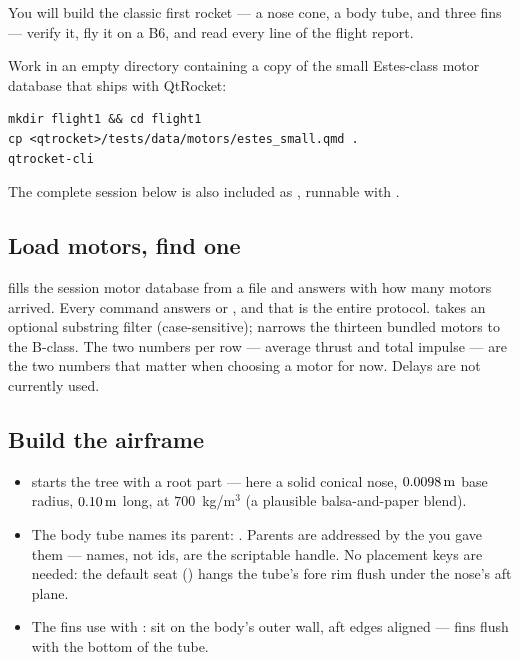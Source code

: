 You will build the classic first rocket --- a nose cone, a body tube, and three
fins --- verify it, fly it on a B6, and read every line of the flight report.

\begin{note}[Setup]
Work in an empty directory containing a copy of the small Estes-class motor
database that ships with QtRocket:
\begin{verbatim}
mkdir flight1 && cd flight1
cp <qtrocket>/tests/data/motors/estes_small.qmd .
qtrocket-cli
\end{verbatim}
The complete session below is also included as
, runnable with
.
\end{note}

\subsection*{Load motors, find one}



 fills the session motor database from a
 file and answers with how many motors arrived. Every command
answers \ok{} or \err{}, and that is the entire protocol. 
takes an optional substring filter (case-sensitive);  narrows the
thirteen bundled motors to the B-class. The two numbers per row --- average
thrust and total impulse --- are the two numbers that matter when choosing a
motor for now. Delays are not currently used.

\subsection*{Build the airframe}



\begin{itemize}
\item {} starts the tree with a root part --- here a solid
      conical nose, $0.0098\,\mathrm{m}$ base radius, $0.10\,\mathrm{m}$ long, at
      $700$~kg/m$^3$ (a plausible balsa-and-paper blend).
\item The body tube names its parent: . Parents are addressed by the  you gave them --- names,
      not ids, are the scriptable handle. No placement keys are needed: the
      default seat () hangs the tube's fore rim flush under the
      nose's aft plane.
\item The fins use  with
      : sit on the body's outer wall,
      aft edges aligned --- fins flush with the bottom of the tube.
\end{itemize}

